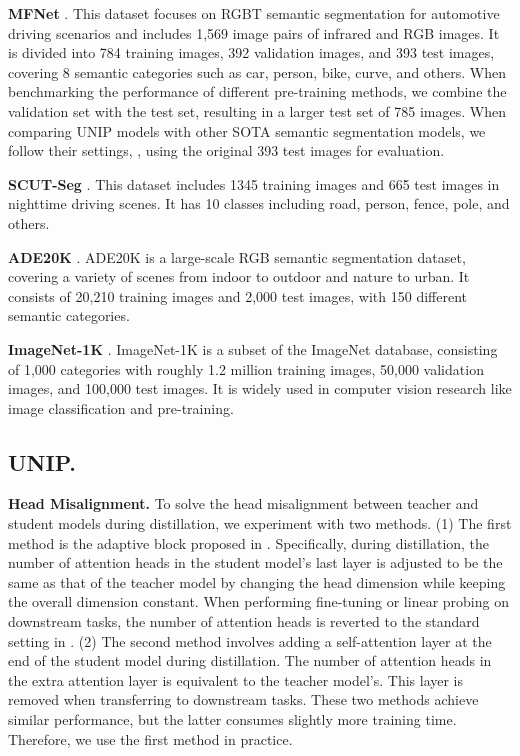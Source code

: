 \textbf{MFNet} \citep{mfnet}. This dataset focuses on RGBT semantic segmentation for automotive driving scenarios and includes 1,569 image pairs of infrared and RGB images. It is divided into 784 training images, 392 validation images, and 393 test images, covering 8 semantic categories such as car, person, bike, curve, and others. When benchmarking the performance of different pre-training methods, we combine the validation set with the test set, resulting in a larger test set of 785 images. When comparing UNIP models with other SOTA semantic segmentation models, we follow their settings, \ie, using the original 393 test images for evaluation.

\textbf{SCUT-Seg} \citep{mcnet}. This dataset includes 1345 training images and 665 test images in nighttime driving scenes. It has 10 classes including road, person, fence, pole, and others.

\textbf{ADE20K} \citep{ade20k}. ADE20K is a large-scale RGB semantic segmentation dataset, covering a variety of scenes from indoor to outdoor and nature to urban. It consists of 20,210 training images and 2,000 test images, with 150 different semantic categories.

\textbf{ImageNet-1K} \citep{imagenet}. ImageNet-1K is a subset of the ImageNet database, consisting of 1,000 categories with roughly 1.2 million training images, 50,000 validation images, and 100,000 test images. It is widely used in computer vision research like image classification and pre-training.

\subsection{UNIP.}
\label{app:pre-training}




\textbf{Head Misalignment.} To solve the head misalignment between teacher and student models during distillation, we experiment with two methods. (1) The first method is the adaptive block proposed in  \citet{tinymim}. Specifically, during distillation, the number of attention heads in the student model's last layer is adjusted to be the same as that of the teacher model by changing the head dimension while keeping the overall dimension constant. When performing fine-tuning or linear probing on downstream tasks, the number of attention heads is reverted to the standard setting in . (2) The second method involves adding a self-attention layer at the end of the student model during distillation. The number of attention heads in the extra attention layer is equivalent to the teacher model's. This layer is removed when transferring to downstream tasks. These two methods achieve similar performance, but the latter consumes slightly more training time. Therefore, we use the first method in practice.

